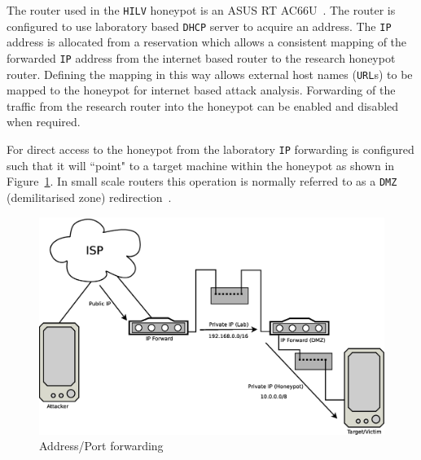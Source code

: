 The router used in the \texttt{HILV} honeypot is an ASUS RT AC66U~\cite{ASUS:17}. The router is configured to use laboratory based \texttt{DHCP} server to acquire an  address. The \texttt{IP} address is allocated from a reservation which allows a consistent mapping of the forwarded \texttt{IP} address from the internet based router to the research honeypot router. Defining the mapping in this way allows external host names (\texttt{URL}s) to be mapped to the honeypot for internet based attack analysis. Forwarding of the traffic from the research router into the honeypot can be enabled and disabled when required. 

For direct access to the honeypot from the laboratory \texttt{IP} forwarding is configured such that it will ``point" to a target machine within the honeypot as shown in Figure~\ref{fig:Forward}. In small scale routers this operation is normally referred to as a \texttt{DMZ} (demilitarised zone) redirection~\cite{DK:08,MB:01}. 

\begin{figure}[h]
\begin{center}
	\includegraphics[scale=0.25]{Images/Forward.eps}
\caption{Address/Port forwarding}
\label{fig:Forward}
\end{center}
\end{figure}

